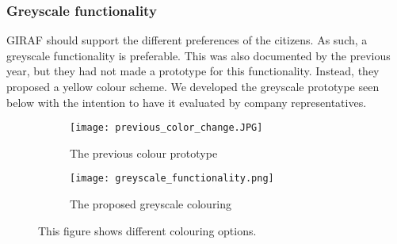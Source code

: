 \subsubsection{Greyscale functionality}
GIRAF should support the different preferences of the citizens. 
As such, a greyscale functionality is preferable.
This was also documented by the previous year, but they had not made a prototype for this functionality.
Instead, they proposed a yellow colour scheme.
We developed the greyscale prototype seen below with the intention to have it evaluated by company representatives.
\begin{figure}[H]
    \begin{subfigure}{0.5\textwidth}
    \texttt{[image: previous\_color\_change.JPG]} 
    \caption{The previous colour prototype}
    \label{fig:previous_greyscale_prototype}
    \end{subfigure}
    \begin{subfigure}{0.5\textwidth}
        \texttt{[image: greyscale\_functionality.png]}
    \caption{The proposed greyscale colouring}
    \label{fig:new_greyscale_prototype}
    \end{subfigure} 
    \caption{This figure shows different colouring options.}
    \label{fig:greyscale_prototype}
\end{figure}



